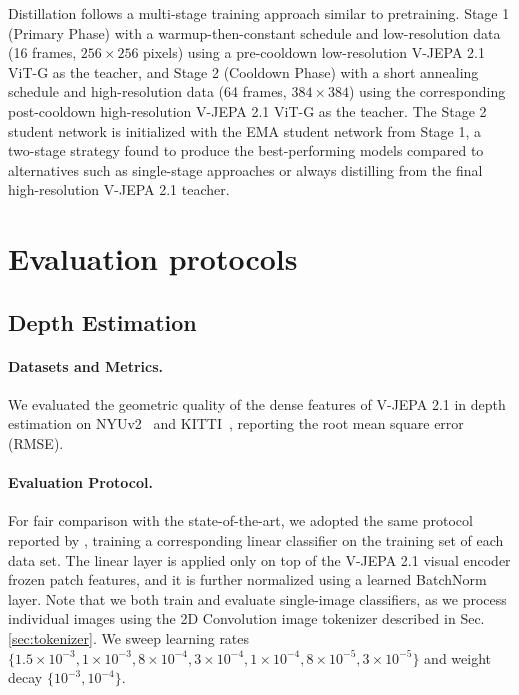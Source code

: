 \documentclass[]{fairmeta}
\begin{document}
Distillation follows a multi-stage training approach similar to pretraining. Stage 1 (Primary Phase) with a warmup-then-constant schedule and low-resolution data (16 frames, $256 \times 256$ pixels) using a pre-cooldown low-resolution V-JEPA 2.1 ViT-G as the teacher, and Stage 2 (Cooldown Phase) with a short annealing schedule and high-resolution data (64 frames, $384 \times 384$) using the corresponding post-cooldown high-resolution V-JEPA 2.1 ViT-G as the teacher. The Stage 2 student network is initialized with the EMA student network from Stage 1, a two-stage strategy found to produce the best-performing models compared to alternatives such as single-stage approaches or always distilling from the final high-resolution V-JEPA 2.1 teacher.

\section{Evaluation protocols} \label{app:evaluation}

\subsection{Depth Estimation}

\paragraph{\bf Datasets and Metrics.} We evaluated the geometric quality of the dense features of V-JEPA 2.1 in depth estimation on NYUv2~\citep{silberman2018nyuv2} and KITTI~\citep{geiger2013kitti}, reporting the root mean square error (RMSE).

\paragraph{\bf Evaluation Protocol.} For fair comparison with the state-of-the-art, we adopted the same protocol reported by \cite{simeoni2025dinov3}, training a corresponding linear classifier on the training set of each data set. 
The linear layer is applied only on top of the V-JEPA 2.1 visual encoder frozen patch features, and it is further normalized using a learned BatchNorm layer.
Note that we both train and evaluate single-image classifiers, as we process individual images using the 2D Convolution image tokenizer described in Sec.\ref{sec:tokenizer}. 
We sweep learning rates $\{1.5\!\times\!10^{-3}, 1\!\times\!10^{-3}, 8\!\times\!10^{-4}, 3\!\times\!10^{-4}, 1\!\times\!10^{-4}, 8\!\times\!10^{-5}, 3\!\times\!10^{-5}\}$ and weight decay $\{10^{-3}, 10^{-4}\}$.
\end{document}
